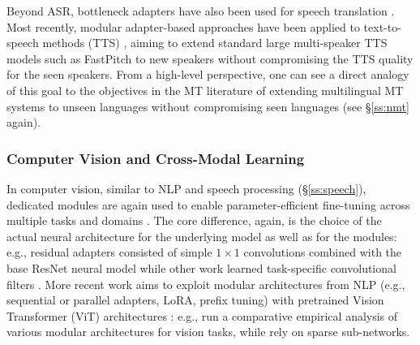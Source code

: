 Beyond ASR, bottleneck adapters have also been used for speech translation \citep{le-etal-2021-lightweight}. Most recently, modular adapter-based approaches have been applied to text-to-speech methods (TTS) \citep{Hsieh:2022tts,Morioka:2022tts}, aiming to extend standard large multi-speaker TTS models such as FastPitch \citep{Lancucki:2021fastpitch} to new speakers without compromising the TTS quality for the seen speakers. From a high-level perspective, one can see a direct analogy of this goal to the objectives in the MT literature of extending multilingual MT systems to unseen languages without compromising seen languages (see \S\ref{ss:nmt} again).




\subsubsection{Computer Vision and Cross-Modal Learning}
\label{ss:cv}
In computer vision, similar to NLP and speech processing (\S\ref{ss:speech}), dedicated modules are again used to enable parameter-efficient fine-tuning across multiple tasks and domains \citep[\textit{among others}]{Rusu2016Progressive,Rebuffi2018Adapters2,Berriel:2019iccv,He:2022arxiv}. The core difference, again, is the choice of the actual neural architecture for the underlying model as well as for the modules: e.g., residual adapters \citep{Rebuffi2017Adapters1} consisted of simple $1 \times 1$ convolutions combined with the base ResNet neural model \citep{He2016ResNet} while other work learned task-specific convolutional filters \citep{newell2019feature,bragman2019stochastic}.
More recent work aims to exploit modular architectures from NLP (e.g., sequential or parallel adapters, LoRA, prefix tuning) with pretrained Vision Transformer (ViT) architectures \citep{dosovitskiy2020image}: e.g., \citet{He:2022arxiv} run a comparative empirical analysis of various modular architectures for vision tasks, while \citet{Chen:2021neurips} rely on sparse sub-networks. %

